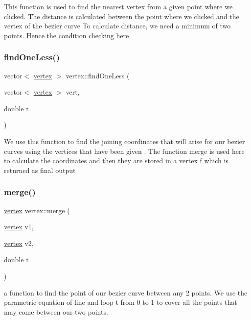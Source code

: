 This function is used to find the nearest vertex from a given point where we clicked. The distance is calculated between the point where we clicked and the vertex of the bezier curve To calculate distance, we need a minimum of two points. Hence the condition checking here \mbox{\label{classvertex_a202d5209c7340d7669c15e1933e677a0}} 
\subsubsection{\texorpdfstring{find\+One\+Less()}{findOneLess()}}
{\footnotesize\ttfamily vector$<$ \hyperlink{classvertex}{vertex} $>$ vertex\+::find\+One\+Less (\begin{DoxyParamCaption}\item[{vector$<$ \hyperlink{classvertex}{vertex} $>$}]{vert,  }\item[{double}]{t }\end{DoxyParamCaption})}

We use this function to find the joining coordinates that will arise for our bezier curves using the vertices that have been given . The function merge is used here to calculate the coordinates and then they are stored in a vertex f which is returned as final output \mbox{\label{classvertex_aefda2986f4a966108034c7c6db0fd280}} 
\subsubsection{\texorpdfstring{merge()}{merge()}}
{\footnotesize\ttfamily \hyperlink{classvertex}{vertex} vertex\+::merge (\begin{DoxyParamCaption}\item[{\hyperlink{classvertex}{vertex}}]{v1,  }\item[{\hyperlink{classvertex}{vertex}}]{v2,  }\item[{double}]{t }\end{DoxyParamCaption})}

a function to find the point of our bezier curve between any 2 points. We use the parametric equation of line and loop t from 0 to 1 to cover all the points that may come between our two points. \mbox{\label{classvertex_ad4edf1c3b1666180030157724c855d58}} 
